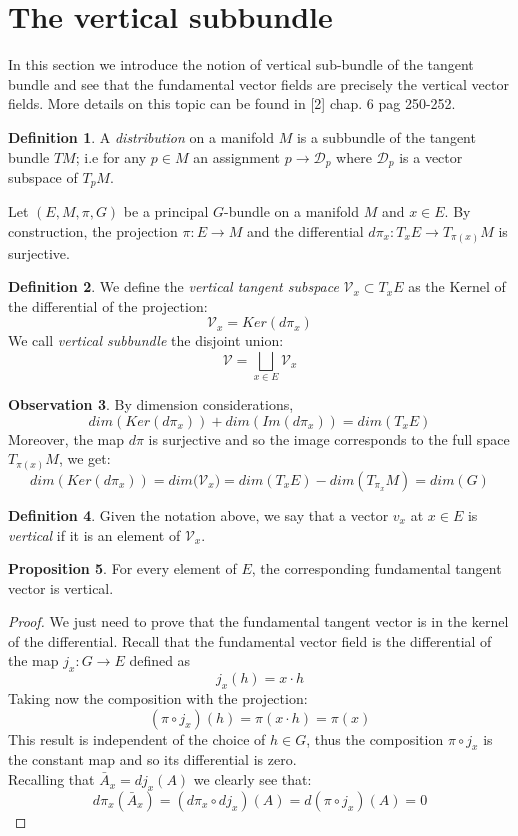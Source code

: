 \documentclass[12pt,a4paper]{report}
\theoremstyle{definition}
\newtheorem{Def}{Definition}[chapter]
\theoremstyle{Theorem}
\newtheorem{Prop}[Def]{Proposition}
\theoremstyle{definition}
\theoremstyle{definition}
\newtheorem{Obs}[Def]{Observation}
\begin{document}
	\section{The vertical subbundle}
	In this section we introduce the notion of vertical sub-bundle of the tangent bundle and see that the fundamental vector fields are precisely the vertical vector fields. More details on this topic can be found in [2] chap. 6 pag 250-252.
	\begin{Def}
		A \textit{distribution} on a manifold $M$ is a subbundle of the tangent bundle $TM$; i.e for any $p\in M$ an assignment $p\rightarrow \mathcal{D}_p$ where $\mathcal{D}_p$ is a vector subspace of $T_pM$.
	\end{Def}
	Let $(E,M,\pi,G)$ be a principal $G$-bundle on a manifold $M$ and $x\in E$. By construction, the projection $\pi:E\rightarrow M$ and the differential $d\pi_{x}:T_{x}E\rightarrow T_{\pi(x)}M$ is surjective. 
	\begin{Def}
		We define the \textit{vertical tangent subspace} $\mathcal{V}_{x}\subset T_{x}E$ as the Kernel of the differential of the projection:
		$$\mathcal{V}_{x}= Ker(d\pi_{x})$$
		We call \textit{vertical subbundle} the disjoint union:
		$$\mathcal{V}=\bigsqcup_{x\in E}\mathcal{V}_x$$
	\end{Def}
	\begin{Obs}
		By dimension considerations, 
		$$dim (Ker(d\pi_{x}))+dim(Im(d\pi_{x}))=dim(T_{x}E)$$
		Moreover, the map $d\pi$ is surjective and so the image corresponds to the full space $T_{\pi(x)}M$, we get:
		$$dim (Ker(d\pi_{x}))=dim\mathcal(\mathcal{V}_{x})=dim(T_{x}E)-dim(T_{\pi_{x}}M)=dim (G)$$
	\end{Obs}
	\begin{Def}
		Given the notation above, we say that a vector $v_x$ at $x\in E$ is \textit{vertical} if it is an element of $\mathcal{V}_x$.
	\end{Def}
	\begin{Prop}\label{fund_vec_are_vert}
		For every element of $E$, the corresponding fundamental tangent vector is vertical.
	\end{Prop}
	\begin{proof}
		We just need to prove that the fundamental tangent vector is in the kernel of the differential. Recall that the fundamental vector field is the differential of the map $j_{x}:G\rightarrow E$ defined as 
		$$j_{x}(h)=x\cdot h $$
		Taking now the composition with the projection:
		$$(\pi\circ j_{x})(h)=\pi(x\cdot h)=\pi(x)$$
		This result is independent of the choice of $h\in G$, thus the composition $\pi\circ j_{x}$ is the constant map and so its differential is zero.\\
		Recalling that $\bar{A}_{x}=dj_{x}(A)$ we clearly see that:
		$$d\pi_{x}(\bar{A}_{x})=
		(d\pi_{x}\circ dj_{x})(A)=
		d(\pi\circ j_{x})(A)=0$$
	\end{proof}
\end{document}
